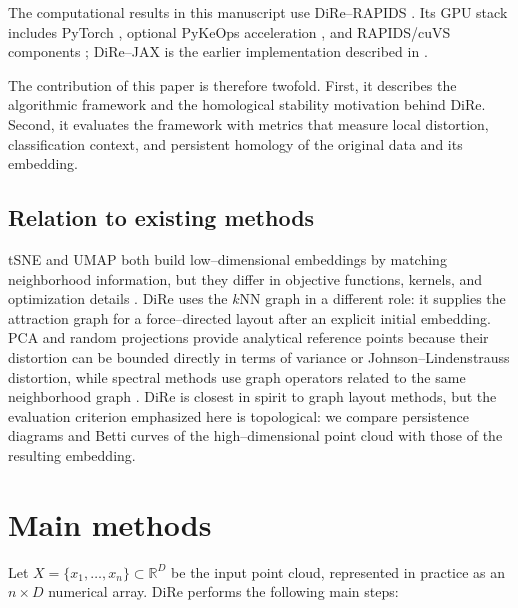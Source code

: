 \documentclass[11pt]{article}
\begin{document}
The computational results in this manuscript use DiRe--RAPIDS \cite{dire-rapids}. Its GPU stack includes PyTorch \cite{pytorch}, optional PyKeOps acceleration \cite{pykeops}, and RAPIDS/cuVS components \cite{cuml,cuvs}; DiRe--JAX is the earlier implementation described in \cite{dire-joss}.

The contribution of this paper is therefore twofold. First, it describes the algorithmic framework and the homological stability motivation behind DiRe. Second, it evaluates the framework with metrics that measure local distortion, classification context, and persistent homology of the original data and its embedding.

\subsection{Relation to existing methods}

tSNE and UMAP both build low--dimensional embeddings by matching neighborhood information, but they differ in objective functions, kernels, and optimization details \cite{vandermaaten-tsne,kobak2019art,umap}. DiRe uses the $k$NN graph in a different role: it supplies the attraction graph for a force--directed layout after an explicit initial embedding. PCA and random projections provide analytical reference points because their distortion can be bounded directly in terms of variance or Johnson--Lindenstrauss distortion, while spectral methods use graph operators related to the same neighborhood graph \cite{belkin-niyogi-laplacian,coifman-lafon-diffusion}. DiRe is closest in spirit to graph layout methods, but the evaluation criterion emphasized here is topological: we compare persistence diagrams and Betti curves of the high--dimensional point cloud with those of the resulting embedding.

\section{Main methods}

Let $X = \{x_1,\ldots,x_n\} \subset \mathbb{R}^D$ be the input point cloud, represented in practice as an $n \times D$ numerical array. DiRe performs the following main steps:
\end{document}
